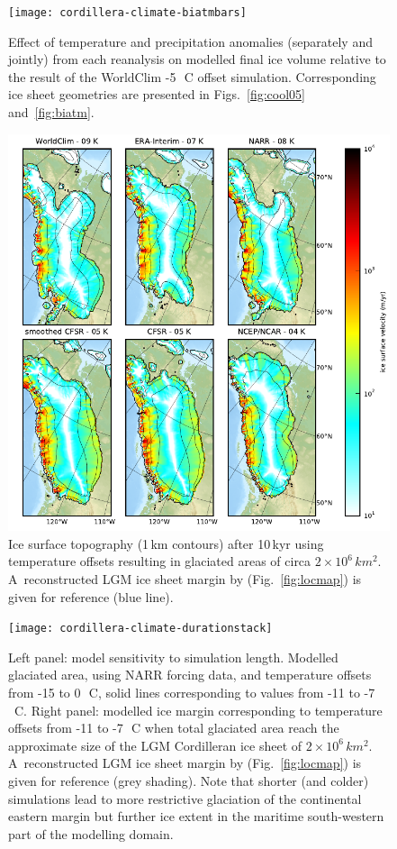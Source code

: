 \documentclass[tc, ms]{copernicus}
\begin{document}
\begin{figure}
  \texttt{[image: cordillera-climate-biatmbars]}
  \caption{Effect of temperature and precipitation anomalies (separately and jointly) from each reanalysis on modelled final ice volume relative to the result of the WorldClim -5\,\unit{{\degree}C} offset simulation. Corresponding ice sheet geometries are presented in Figs.~\ref{fig:cool05} and~\ref{fig:biatm}.}
  \label{fig:biatmbars}
\end{figure}

\begin{figure}
  \includegraphics{cordillera-climate-best}
  \caption{Ice surface topography (1\,km contours) after 10\,kyr using temperature offsets resulting in glaciated areas of circa $2 \times 10^6\,\unit{km^2}$. A~reconstructed LGM ice sheet margin by \citet{dyke-2004} (Fig.~\ref{fig:locmap}) is given for reference (blue line).}
  \label{fig:best}
\end{figure}

\begin{figure}
  \texttt{[image: cordillera-climate-durationstack]}
  \caption{Left panel: model sensitivity to simulation length. Modelled glaciated area, using NARR forcing data, and temperature offsets from -15 to 0\,\unit{{\degree}C}, solid lines corresponding to values from -11 to -7\,\unit{{\degree}C}. Right panel: modelled ice margin corresponding to temperature offsets from -11 to -7\,\unit{{\degree}C} when total glaciated area reach the approximate size of the LGM Cordilleran ice sheet of $2 \times 10^6\,\unit{km^2}$. A~reconstructed LGM ice sheet margin by \citet{dyke-2004} (Fig.~\ref{fig:locmap}) is given for reference (grey shading). Note that shorter (and colder) simulations lead to more restrictive glaciation of the continental eastern margin but further ice extent in the maritime south-western part of the modelling domain.}
  \label{fig:durationstack}
\end{figure}

\end{document}
